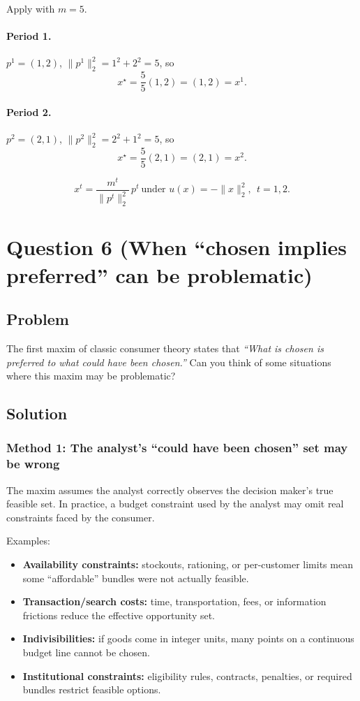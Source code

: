 \documentclass[12pt]{article}
\begin{document}
Apply with \(m=5\).

\paragraph{Period 1.} \(p^1=(1,2)\), \(\|p^1\|_2^2=1^2+2^2=5\), so
\[
x^\star=\frac{5}{5}(1,2)=(1,2)=x^1.
\]

\paragraph{Period 2.} \(p^2=(2,1)\), \(\|p^2\|_2^2=2^2+1^2=5\), so
\[
x^\star=\frac{5}{5}(2,1)=(2,1)=x^2.
\]

\[
\boxed{x^t=\frac{m^t}{\|p^t\|_2^2}\,p^t\ \text{under } u(x)=-\|x\|_2^2,\ \ t=1,2.}
\]

\newpage
\section*{Question 6 (When ``chosen implies preferred'' can be problematic)}
\subsection*{Problem}
The first maxim of classic consumer theory states that
\emph{``What is chosen is preferred to what could have been chosen.''}
Can you think of some situations where this maxim may be problematic?

\subsection*{Solution}

\subsubsection*{Method 1: The analyst's ``could have been chosen'' set may be wrong}
The maxim assumes the analyst correctly observes the decision maker's true feasible set.
In practice, a budget constraint used by the analyst may omit real constraints faced by the consumer.

Examples:
\begin{itemize}[leftmargin=*]
\item \textbf{Availability constraints:} stockouts, rationing, or per-customer limits mean some ``affordable'' bundles were not actually feasible.
\item \textbf{Transaction/search costs:} time, transportation, fees, or information frictions reduce the effective opportunity set.
\item \textbf{Indivisibilities:} if goods come in integer units, many points on a continuous budget line cannot be chosen.
\item \textbf{Institutional constraints:} eligibility rules, contracts, penalties, or required bundles restrict feasible options.
\end{itemize}
\end{document}
